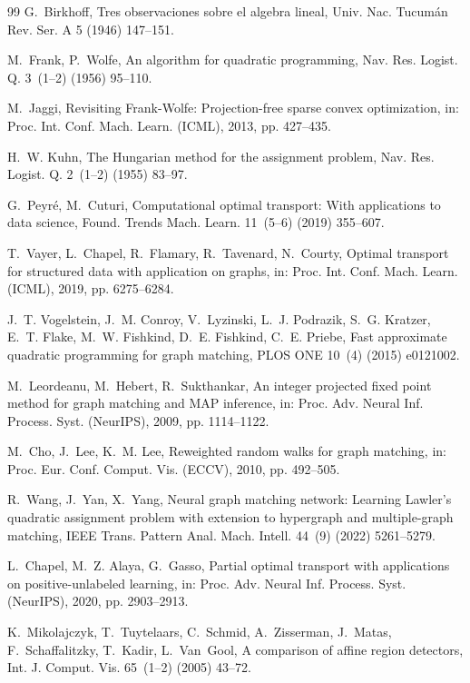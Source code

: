 \documentclass[a4paper,fleqn]{cas-dc}
\theoremstyle{thmstyleone}
\theoremstyle{thmstyletwo}
\theoremstyle{thmstylethree}
\begin{document}
\begin{thebibliography}{99}
G.~Birkhoff, Tres observaciones sobre el algebra lineal, Univ. Nac. Tucum\'an Rev. Ser. A 5 (1946) 147--151.

M.~Frank, P.~Wolfe, An algorithm for quadratic programming, Nav. Res. Logist. Q. 3~(1--2) (1956) 95--110.

M.~Jaggi, Revisiting Frank-Wolfe: Projection-free sparse convex optimization, in: Proc. Int. Conf. Mach. Learn. (ICML), 2013, pp. 427--435.

H.~W. Kuhn, The Hungarian method for the assignment problem, Nav. Res. Logist. Q. 2~(1--2) (1955) 83--97.

G.~Peyr{\'e}, M.~Cuturi, Computational optimal transport: With applications to data science, Found. Trends Mach. Learn. 11~(5--6) (2019) 355--607.

T.~Vayer, L.~Chapel, R.~Flamary, R.~Tavenard, N.~Courty, Optimal transport for structured data with application on graphs, in: Proc. Int. Conf. Mach. Learn. (ICML), 2019, pp. 6275--6284.

J.~T. Vogelstein, J.~M. Conroy, V.~Lyzinski, L.~J. Podrazik, S.~G. Kratzer, E.~T. Flake, M.~W. Fishkind, D.~E. Fishkind, C.~E. Priebe, Fast approximate quadratic programming for graph matching, PLOS ONE 10~(4) (2015) e0121002.

M.~Leordeanu, M.~Hebert, R.~Sukthankar, An integer projected fixed point method for graph matching and {MAP} inference, in: Proc. Adv. Neural Inf. Process. Syst. (NeurIPS), 2009, pp. 1114--1122.

M.~Cho, J.~Lee, K.~M. Lee, Reweighted random walks for graph matching, in: Proc. Eur. Conf. Comput. Vis. (ECCV), 2010, pp. 492--505.

R.~Wang, J.~Yan, X.~Yang, Neural graph matching network: Learning Lawler's quadratic assignment problem with extension to hypergraph and multiple-graph matching, IEEE Trans. Pattern Anal. Mach. Intell. 44~(9) (2022) 5261--5279.

L.~Chapel, M.~Z. Alaya, G.~Gasso, Partial optimal transport with applications on positive-unlabeled learning, in: Proc. Adv. Neural Inf. Process. Syst. (NeurIPS), 2020, pp. 2903--2913.

K.~Mikolajczyk, T.~Tuytelaars, C.~Schmid, A.~Zisserman, J.~Matas, F.~Schaffalitzky, T.~Kadir, L.~Van~Gool, A comparison of affine region detectors, Int. J. Comput. Vis. 65~(1--2) (2005) 43--72.


\end{thebibliography}
\end{document}
